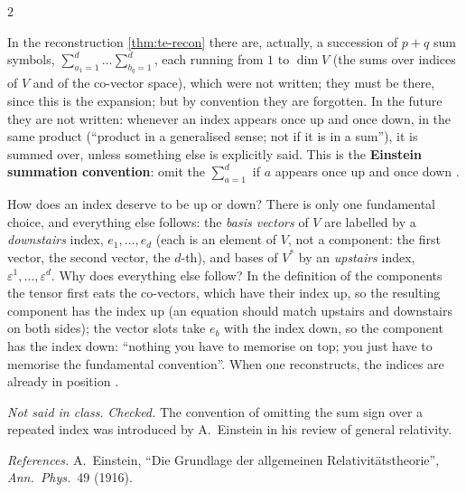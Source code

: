 \begin{paracol}{2}
\begin{definition}\label{def:te-einstein}
In the reconstruction \cref{thm:te-recon} there are, actually, a succession of $p+q$ sum symbols, $\sum_{a_1=1}^d\dots\sum_{b_q=1}^d$, each running from $1$ to $\dim V$ (the sums over indices of $V$ and of the co-vector space), which were not written; they must be there, since this is the expansion; but by convention they are forgotten. In the future they are not written:
whenever an index appears once up and once down, in the same product (``product in a generalised sense; not if it is in a sum''), it is summed over, unless something else is explicitly said. This is the \textbf{Einstein summation convention}: omit the $\sum_{a=1}^d$ if $a$ appears once up and once down
.
\end{definition}
\begin{definition}\label{def:te-updown}
How does an index deserve to be up or down? There is only one fundamental choice, and everything else follows: the \emph{basis vectors} of $V$ are labelled by a \emph{downstairs} index, $e_1,\dots,e_d$ (each is an element of $V$, not a component: the first vector, the second vector, the $d$-th), and bases of $V^*$ by an \emph{upstairs}
index, $\varepsilon^1,\dots,\varepsilon^d$. Why does everything else follow? In the definition of the components the tensor first eats the co-vectors, which have their index up, so the resulting component has the index up (an equation should match upstairs and downstairs on both sides); the vector slots take $e_b$ with the index down,
so the component has the index down: ``nothing you have to memorise on top; you just have to memorise the fundamental convention''. When one reconstructs, the indices are already in position .
\end{definition}
\begin{history}
\emph{Not said in class.} \emph{Checked.} The convention of omitting the sum sign over a repeated index was introduced by A.~Einstein in his review of general relativity.\par
\emph{References.} A.~Einstein, ``Die Grundlage der allgemeinen Relativit\"atstheorie'', \emph{Ann.\ Phys.}\ 49 (1916).
\end{history}


\end{paracol}
